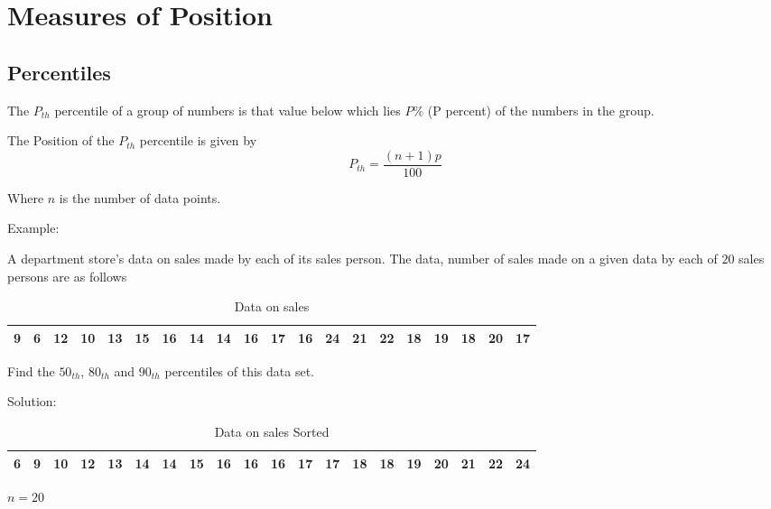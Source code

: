\chapter{Measures of Position}%

\section{Percentiles}
The $P_{th}$ percentile of a group of numbers is that value below which lies $P\%$ (P percent) of the numbers in the group.

The Position of the $P_{th}$ percentile is given by
\begin{equation}
    P_{th} = \frac{(n+1)p}{100}
\end{equation}

Where $n$ is the number of data points.

Example:

A department store's data on sales made by each  of its sales person. The data, number of sales made on a given data by each of $20$ sales persons are as follows
\begin{table}[H]
    \centering
    \caption{Data on sales}
    \begin{tabular}{|*{20}{c|}}

        \hline
        9  & 6  & 12 & 10 & 13 & 15 & 16 & 14 & 14 & 16 &
        17 & 16 & 24 & 21 & 22 & 18 & 19 & 18 & 20 & 17   \\
        \hline
    \end{tabular}
\end{table}


Find the $50_{th}$, $80_{th}$ and $90_{th}$ percentiles of this data set.

Solution:
\begin{table}[H]
    \centering
    \caption{Data on sales Sorted}
    \begin{tabular}{|*{20}{c|}}

        \hline
        6 & 9 & 10 & 12 & 13 & 14 & 14 & 15 & 16 & 16 & 16 & 17 & 17 & 18 & 18 & 19 & 20 & 21 & 22 & 24 \\
        \hline
    \end{tabular}
\end{table}

$n = 20$

